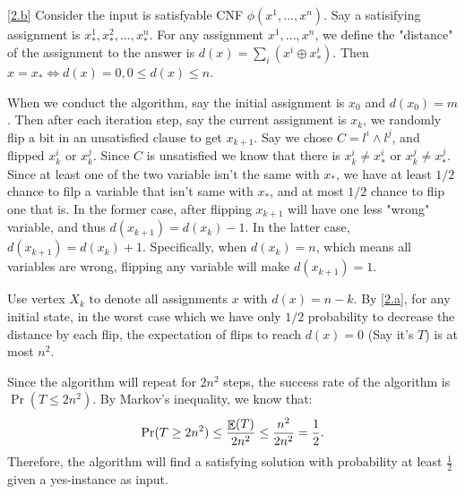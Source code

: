 \documentclass{homework}
\begin{document}
\begin{solution}
\ref{2.b}
Consider the input is satisfyable CNF $\phi(x^1,...,x^n)$. Say a satisifying assignment is $x^1_*,x^2_*,...,x^n_*$. For any assignment $x^1,...,x^n$, we define the "distance" of the assignment to the answer is $d(x) = \sum_{i}(x^i\oplus x^i_*)$. Then $x=x_*\iff d(x)=0, 0\le d(x)\le n$.

When we conduct the algorithm, say the initial assignment is $x_0$ and $d(x_0) = m$. Then after each iteration step, say the current assignment is $x_k$, we randomly flip a bit in an unsatisfied clause to get $x_{k+1}$. Say we chose $C = l^i \land l^j$, and flipped $x^i_k$ or $x^j_k$. Since $C$ is unsatisfied we know that there is $x^i_k\ne x^i_*$ or $x^j_k\ne x^j_*$. Since at least one of the two variable isn't the same with $x_*$, we have at least $1/2$ chance to filp a variable that isn't same with $x_*$, and at most $1/2$ chance to flip one that is. In the former case, after flipping $x_{k+1}$ will have one less "wrong" variable, and thus $d(x_{k+1}) = d(x_k) - 1$. In the latter case, $d(x_{k+1}) = d(x_k) + 1$. Specifically, when $d(x_k)=n$, which means all variables are wrong, flipping any variable will make $d(x_{k+1})=1$.

Use vertex $X_k$ to denote all assignments $x$ with $d(x)=n-k$. By \ref{2.a}, for any initial state, in the worst case which we have only $1/2$ probability to decrease the distance by each flip, the expectation of flips to reach $d(x)=0$ (Say it's $T$) is at most $n^2$.

Since the algorithm will repeat for $2n^2$ steps, the success rate of the algorithm is $\Pr(T\le 2n^2)$. By Markov's inequality, we know that:
\begin{align*}
  \Pr(T\ge 2n^2) \le \frac{\mathop{\mathbb{E}}\displaylimits(T)}{2n^2} \le \frac{n^2}{2n^2} = \frac{1}{2}.
\end{align*}
Therefore, the algorithm will find a satisfying
solution with probability at least $\frac{1}{2}$ given a yes-instance as input.
\end{solution}
\end{document}
